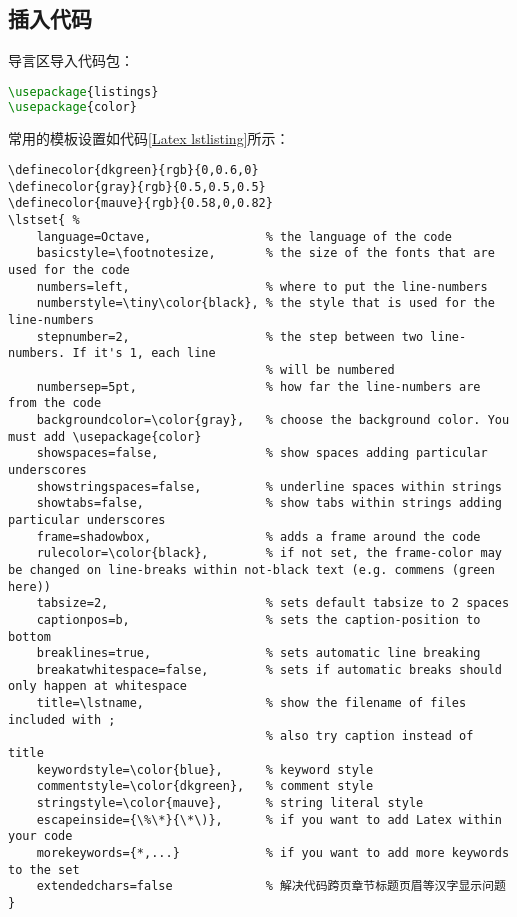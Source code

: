 \documentclass[../main.tex]{subfiles}
\begin{document}
\subsection{插入代码}
导言区导入代码包：
\begin{lstlisting}[language=tex]
\usepackage{listings}
\usepackage{color}
\end{lstlisting}
常用的模板设置如代码\ref{Latex lstlisting}所示：
\begin{lstlisting}[caption = {Latex代码模板},language=Tex,label = {Latex lstlisting}] 
\definecolor{dkgreen}{rgb}{0,0.6,0}
\definecolor{gray}{rgb}{0.5,0.5,0.5}
\definecolor{mauve}{rgb}{0.58,0,0.82}
\lstset{ %
    language=Octave,                % the language of the code
    basicstyle=\footnotesize,       % the size of the fonts that are used for the code
    numbers=left,                   % where to put the line-numbers
    numberstyle=\tiny\color{black}, % the style that is used for the line-numbers
    stepnumber=2,                   % the step between two line-numbers. If it's 1, each line 
                                    % will be numbered
    numbersep=5pt,                  % how far the line-numbers are from the code
    backgroundcolor=\color{gray},   % choose the background color. You must add \usepackage{color}
    showspaces=false,               % show spaces adding particular underscores
    showstringspaces=false,         % underline spaces within strings
    showtabs=false,                 % show tabs within strings adding particular underscores
    frame=shadowbox,                % adds a frame around the code
    rulecolor=\color{black},        % if not set, the frame-color may be changed on line-breaks within not-black text (e.g. commens (green here))
    tabsize=2,                      % sets default tabsize to 2 spaces
    captionpos=b,                   % sets the caption-position to bottom
    breaklines=true,                % sets automatic line breaking
    breakatwhitespace=false,        % sets if automatic breaks should only happen at whitespace
    title=\lstname,                 % show the filename of files included with ;
                                    % also try caption instead of title
    keywordstyle=\color{blue},      % keyword style
    commentstyle=\color{dkgreen},   % comment style
    stringstyle=\color{mauve},      % string literal style
    escapeinside={\%\*}{\*\)},      % if you want to add Latex within your code
    morekeywords={*,...}            % if you want to add more keywords to the set
    extendedchars=false             % 解决代码跨页章节标题页眉等汉字显示问题
} 
\end{lstlisting}
\end{document}
